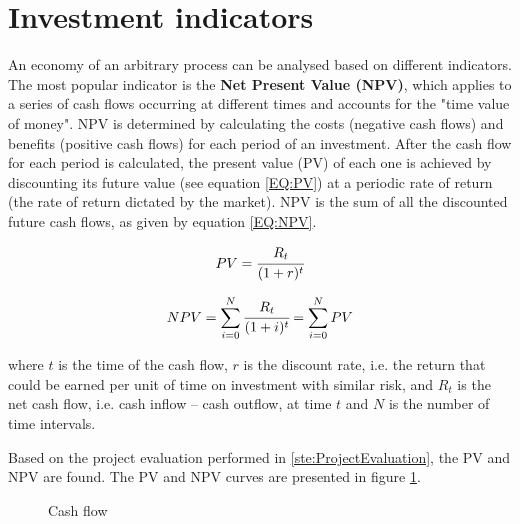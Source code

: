 	\section{Investment indicators}
	
	An economy of an arbitrary process can be analysed based on different indicators. The most popular indicator is the \textbf{Net Present Value (NPV)}, which applies to a series of cash flows occurring at different times and accounts for the "time value of money". NPV is determined by calculating the costs (negative cash flows) and benefits (positive cash flows) for each period of an investment. After the cash flow for each period is calculated, the present value (PV) of each one is achieved by discounting its future value (see equation \ref{EQ:PV}) at a periodic rate of return (the rate of return dictated by the market). NPV is the sum of all the discounted future cash flows, as given by equation \ref{EQ:NPV}.
	
	\begin{equation}
		PV = \cfrac{R_t}{(1+r)^t}
		\label{EQ:PV}
	\end{equation}

	\begin{equation}
		NPV = \sum_{i=0}^{N} \cfrac{R_{t}}{(1+i)^t} = \sum_{i=0}^{N} PV
		\label{EQ:NPV}
	\end{equation}

	where $t$ is the time of the cash flow, $r$ is the discount rate, i.e. the return that could be earned per unit of time on investment with similar risk, and $R_{t}$ is the net cash flow, i.e. cash inflow – cash outflow, at time $t$ and $N$ is the number of time intervals.
	
	Based on the project evaluation performed in \ref{ste:ProjectEvaluation}, the PV and NPV are found. The PV and NPV curves are presented in figure \ref{fig:CashFlow}.
	
	\begin{figure}[h!]
		\centering
	\caption{Cash flow}
	\label{fig:CashFlow}
	\end{figure}

